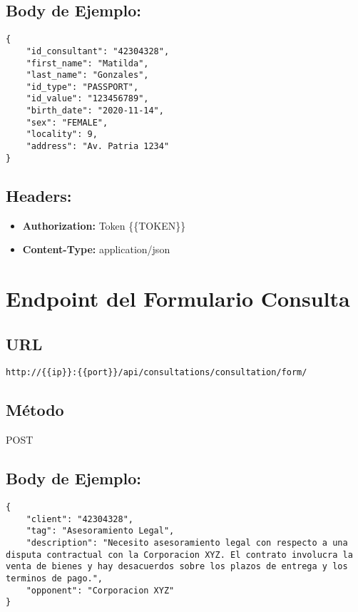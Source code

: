 \newpage
\subsection*{Body de Ejemplo:}

\begin{lstlisting}[caption=Body de Ejemplo, label=example-body-son]
{
    "id_consultant": "42304328",
    "first_name": "Matilda",
    "last_name": "Gonzales",
    "id_type": "PASSPORT",
    "id_value": "123456789",
    "birth_date": "2020-11-14",
    "sex": "FEMALE",
    "locality": 9,
    "address": "Av. Patria 1234"
}
\end{lstlisting}


\subsection*{Headers:}

\begin{itemize}
    \item \textbf{Authorization:} Token \{\{TOKEN\}\}
    \item \textbf{Content-Type:} application/json
\end{itemize}




\section{Endpoint del Formulario Consulta}

\subsection*{URL}
\texttt{http://\{\{ip\}\}:\{\{port\}\}/api/consultations/consultation/form/}

\subsection*{Método}
POST

\subsection*{Body de Ejemplo:}

\begin{lstlisting}[caption=Body de Ejemplo, label=example-body-consultation]
{
    "client": "42304328",
    "tag": "Asesoramiento Legal",
    "description": "Necesito asesoramiento legal con respecto a una disputa contractual con la Corporacion XYZ. El contrato involucra la venta de bienes y hay desacuerdos sobre los plazos de entrega y los terminos de pago.",
    "opponent": "Corporacion XYZ"
}
\end{lstlisting}

